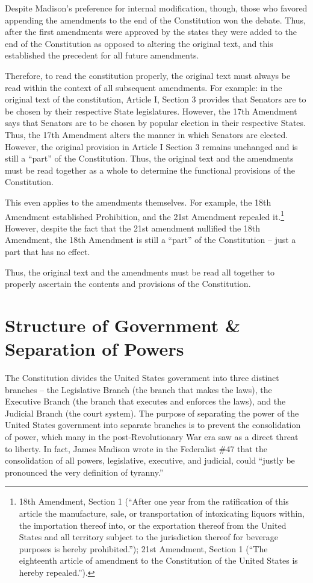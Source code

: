 Despite Madison's preference for internal modification, though, those who favored appending the amendments to the end of the Constitution won the debate.  Thus, after the first amendments were approved by the states they were added to the end of the Constitution as opposed to altering the original text, and this established the precedent for all future amendments. 

Therefore, to read the constitution properly, the original text must always be read within the context of all subsequent amendments.  For example: in the original text of the constitution, Article I, Section 3 provides that Senators are to be chosen by their respective State legislatures.  However, the 17th Amendment says that Senators are to be chosen by popular election in their respective States.  Thus, the 17th Amendment alters the manner in which Senators are elected.  However, the original provision in Article I Section 3 remains unchanged and is still a ``part'' of the Constitution.  Thus, the original text and the amendments must be read together as a whole to determine the functional provisions of the Constitution.

This even applies to the amendments themselves.  For example, the 18th Amendment established Prohibition, and the 21st Amendment repealed it.\footnote{18th Amendment, Section 1 (``After one year from the ratification of this article the manufacture, sale, or transportation of intoxicating liquors within, the importation thereof into, or the exportation thereof from the United States and all territory subject to the jurisdiction thereof for beverage purposes is hereby prohibited.'');  21st Amendment, Section 1 (``The eighteenth article of amendment to the Constitution of the United States is hereby repealed.'').}  However, despite the fact that the 21st amendment nullified the 18th Amendment, the 18th Amendment is still a ``part'' of the Constitution -- just a part that has no effect.

Thus, the original text and the amendments must be read all together to properly ascertain the contents and provisions of the Constitution.

\section{Structure of Government \& Separation of Powers}

The Constitution divides the United States government into three distinct branches -- the Legislative Branch (the branch that makes the laws), the Executive Branch (the branch that executes and enforces the laws), and the Judicial Branch (the court system).  The purpose of separating the power of the United States government into separate branches is to prevent the consolidation of power, which many in the post-Revolutionary War era saw as a direct threat to liberty.  In fact, James Madison wrote in the Federalist \#47 that the consolidation of all powers, legislative, executive, and judicial, could ``justly be pronounced the very definition of tyranny.''


